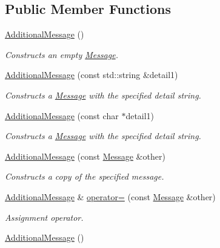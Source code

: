 \subsection*{Public Member Functions}
\begin{DoxyCompactItemize}
\item 
\hypertarget{class_additional_message_a11cce1f25a74d6bd6b5041fb6a854ae9}{\hyperlink{class_additional_message_a11cce1f25a74d6bd6b5041fb6a854ae9}{Additional\+Message} ()}\label{class_additional_message_a11cce1f25a74d6bd6b5041fb6a854ae9}

\begin{DoxyCompactList}\small\item\em Constructs an empty \hyperlink{class_message}{Message}. \end{DoxyCompactList}\item 
\hyperlink{class_additional_message_a990455bbfe260bc04f99e5acc58d1c06}{Additional\+Message} (const std\+::string \&detail1)
\begin{DoxyCompactList}\small\item\em Constructs a \hyperlink{class_message}{Message} with the specified detail string. \end{DoxyCompactList}\item 
\hyperlink{class_additional_message_a6486540f9b5d1957230e9e1f969adc9d}{Additional\+Message} (const char $\ast$detail1)
\begin{DoxyCompactList}\small\item\em Constructs a \hyperlink{class_message}{Message} with the specified detail string. \end{DoxyCompactList}\item 
\hyperlink{class_additional_message_a75735b6fd65686f31349d01c97c73bc7}{Additional\+Message} (const \hyperlink{class_message}{Message} \&other)
\begin{DoxyCompactList}\small\item\em Constructs a copy of the specified message. \end{DoxyCompactList}\item 
\hyperlink{class_additional_message}{Additional\+Message} \& \hyperlink{class_additional_message_ae2ade7e5b91c72250892cceb276fefaf}{operator=} (const \hyperlink{class_message}{Message} \&other)
\begin{DoxyCompactList}\small\item\em Assignment operator. \end{DoxyCompactList}\item 
\hypertarget{class_additional_message_a888715179848c5e5c385789b962a3cfb}{\hyperlink{class_additional_message_a888715179848c5e5c385789b962a3cfb}{Additional\+Message} ()}\label{class_additional_message_a888715179848c5e5c385789b962a3cfb}


\end{DoxyCompactItemize}
